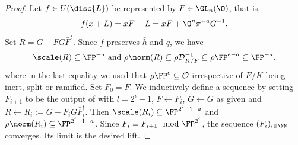 \begin{proof}
 Let $f \in U(\disc{L})$ be represented by $F \in \GL_n(\O)$,
 that is,
 \[f(x + L) = x F + L = x F + \O^{n} \pi^{-a}G^{-1} .\]
 Set $R = G - F G \bar F^t$. Since $f$ preserves $\bar h$ and $\bar q$, we have
 \[\scale(R) \subseteq \FP^{-a} \text{ and } \rho\norm(R) \subseteq \rho\mathcal{D}_{K/F}^{-1}\subseteq\rho\FP^{e-a}\subseteq\FP^{-a}.\]
 where in the last equality we used that $\rho\FP^e \subseteq \mathcal{O}$ irrespective of $E/K$ being inert, split or ramified.
 Set $F_0 = F$. We inductively define a sequence by setting $F_{i+1}$ to be the output of
  with $l = 2^i-1$, $F \gets F_i$, $G \gets G$ as given and
  $R \gets R_i:= G - F_i G \bar F_i^t$. 
 Then $\scale(R_i) \subseteq \FP^{2^i-1 -a }$ and $\rho\norm(R_i) \subseteq \FP^{2^i-1-a}$.
 Since $F_i \equiv F_{i+1} \mod \FP^{2^i}$, the sequence $(F_i)_{i \in \NN}$ converges.
 Its limit is the desired lift.
%

\end{proof}
